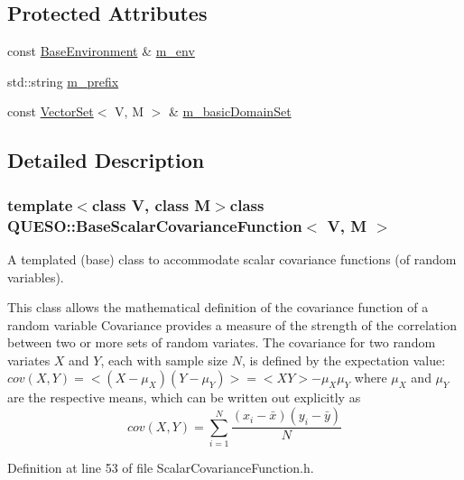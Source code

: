 \subsection*{Protected Attributes}
\begin{DoxyCompactItemize}
\item 
const \hyperlink{class_q_u_e_s_o_1_1_base_environment}{Base\-Environment} \& \hyperlink{class_q_u_e_s_o_1_1_base_scalar_covariance_function_a2a100016b480c498b5219fb937d62543}{m\-\_\-env}
\item 
std\-::string \hyperlink{class_q_u_e_s_o_1_1_base_scalar_covariance_function_a21636873436b88cb77075c6edbd61c71}{m\-\_\-prefix}
\item 
const \hyperlink{class_q_u_e_s_o_1_1_vector_set}{Vector\-Set}$<$ V, M $>$ \& \hyperlink{class_q_u_e_s_o_1_1_base_scalar_covariance_function_a1060392114362022e427678d0f97ab12}{m\-\_\-basic\-Domain\-Set}
\end{DoxyCompactItemize}


\subsection{Detailed Description}
\subsubsection*{template$<$class V, class M$>$class Q\-U\-E\-S\-O\-::\-Base\-Scalar\-Covariance\-Function$<$ V, M $>$}

A templated (base) class to accommodate scalar covariance functions (of random variables). 

This class allows the mathematical definition of the covariance function of a random variable Covariance provides a measure of the strength of the correlation between two or more sets of random variates. The covariance for two random variates $ X $ and $ Y $, each with sample size $ N $, is defined by the expectation value\-: $ cov (X,Y) = <(X-\mu_X)(Y-\mu_Y)> = < X Y > - \mu_X \mu_Y $ where $ \mu_X $ and $ \mu_Y $ are the respective means, which can be written out explicitly as \[ cov (X,Y) = \sum_{i=1}^{N} \frac{(x_i - \bar{x})(y_i - \bar{y})}{N}\] 

Definition at line 53 of file Scalar\-Covariance\-Function.\-h.



